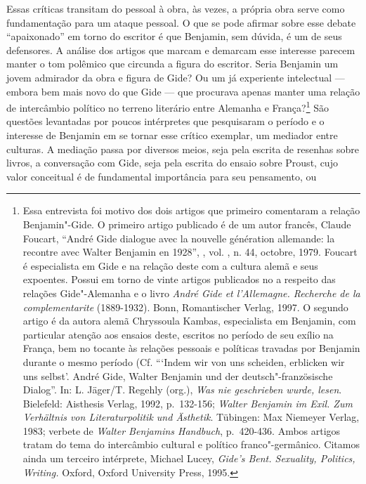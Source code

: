 Essas críticas transitam do pessoal à obra, às vezes, a própria obra
serve como fundamentação para um ataque pessoal. O que se pode afirmar
sobre esse debate ``apaixonado'' em torno do escritor é que Benjamin,
sem dúvida, é um de seus defensores. A análise dos artigos que marcam e
demarcam esse interesse parecem manter o tom polêmico que circunda a
figura do escritor. Seria Benjamin um jovem admirador da obra e figura
de Gide? Ou um já experiente intelectual --- embora bem mais novo do que
Gide --- que procurava apenas manter uma relação de intercâmbio político
no terreno literário entre Alemanha e França?\footnote{Essa entrevista
  foi motivo dos dois artigos que primeiro comentaram a relação
  Benjamin"-Gide. O primeiro artigo publicado é de um autor francês,
  Claude Foucart, ``André Gide dialogue avec la nouvelle génération
  allemande: la recontre avec Walter Benjamin en 1928'', , vol. ,
  n. 44, octobre, 1979. Foucart é especialista em Gide e na relação
  deste com a cultura alemã e seus expoentes. Possui em torno de vinte
  artigos publicados no  a respeito das relações Gide"-Alemanha e o
  livro \emph{André Gide et l'Allemagne. Recherche de la
  complementarite} (1889-1932). Bonn, Romantischer Verlag, 1997. O
  segundo artigo é da autora alemã Chryssoula Kambas, especialista em
  Benjamin, com particular atenção aos ensaios deste, escritos no
  período de seu exílio na França, bem no tocante às relações pessoais e
  políticas travadas por Benjamin durante o mesmo período (Cf. ```Indem
  wir von uns scheiden, erblicken wir uns selbst'. André Gide, Walter
  Benjamin und der deutsch"-französische Dialog''. In: L. Jäger/T.
  Regehly (org.), \emph{Was nie geschrieben wurde, lesen}. Bielefeld:
  Aisthesis Verlag, 1992, p.~132-156; \emph{Walter Benjamin im Exil. Zum
  Verhältnis von Literaturpolitik und Ästhetik}. Tübingen: Max Niemeyer
  Verlag, 1983; verbete de \emph{Walter Benjamins Handbuch}, p.~420-436.
  Ambos artigos tratam do tema do intercâmbio cultural e político
  franco"-germânico. Citamos ainda um terceiro intérprete, Michael Lucey,
  \emph{Gide's Bent. Sexuality, Politics, Writing.} Oxford, Oxford
  University Press, 1995.} São questões levantadas por poucos
intérpretes que pesquisaram o período e o interesse de Benjamin em se
tornar esse crítico exemplar, um mediador entre culturas. A mediação
passa por diversos meios, seja pela escrita de resenhas sobre livros, a
conversação com Gide, seja pela escrita do ensaio sobre Proust, cujo
valor conceitual é de fundamental importância para seu pensamento, ou
